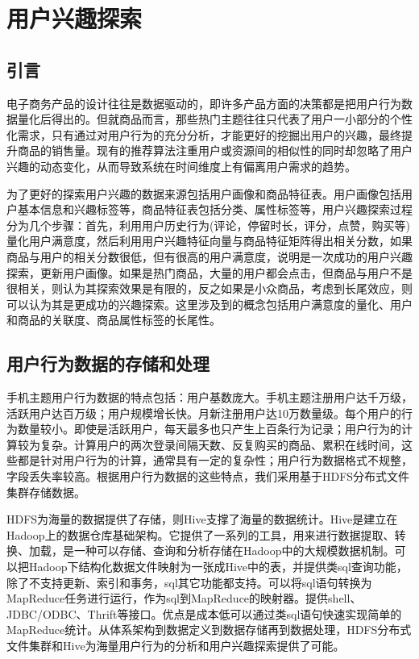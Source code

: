 
\chapter{用户兴趣探索}
\section{引言}
\label{chap:interestExplore}
电子商务产品的设计往往是数据驱动的，即许多产品方面的决策都是把用户行为数据量化后得出的。但就商品而言，那些热门主题往往只代表了用户一小部分的个性化需求，只有通过对用户行为的充分分析，才能更好的挖掘出用户的兴趣，最终提升商品的销售量。现有的推荐算法注重用户或资源间的相似性的同时却忽略了用户兴趣的动态变化，从而导致系统在时间维度上有偏离用户需求的趋势。

为了更好的探索用户兴趣的数据来源包括用户画像和商品特征表。用户画像包括用户基本信息和兴趣标签等，商品特征表包括分类、属性标签等，用户兴趣探索过程分为几个步骤：首先，利用用户历史行为(评论，停留时长，评分，点赞，购买等)量化用户满意度，然后利用用户兴趣特征向量与商品特征矩阵得出相关分数，如果商品与用户的相关分数很低，但有很高的用户满意度，说明是一次成功的用户兴趣探索，更新用户画像。如果是热门商品，大量的用户都会点击，但商品与用户不是很相关，则认为其探索效果是有限的，反之如果是小众商品，考虑到长尾效应，则可以认为其是更成功的兴趣探索。这里涉及到的概念包括用户满意度的量化、用户和商品的关联度、商品属性标签的长尾性。

\section{用户行为数据的存储和处理}
手机主题用户行为数据的特点包括：用户基数庞大。手机主题注册用户达千万级，活跃用户达百万级；用户规模增长快。月新注册用户达10万数量级。每个用户的行为数量较小。即使是活跃用户，每天最多也只产生上百条行为记录；用户行为的计算较为复杂。计算用户的两次登录间隔天数、反复购买的商品、累积在线时间，这些都是针对用户行为的计算，通常具有一定的复杂性；用户行为数据格式不规整，字段丢失率较高。根据用户行为数据的这些特点，我们采用基于HDFS分布式文件集群存储数据。

HDFS为海量的数据提供了存储，则Hive支撑了海量的数据统计。Hive是建立在Hadoop上的数据仓库基础架构。它提供了一系列的工具，用来进行数据提取、转换、加载，是一种可以存储、查询和分析存储在Hadoop中的大规模数据机制。可以把Hadoop下结构化数据文件映射为一张成Hive中的表，并提供类sql查询功能，除了不支持更新、索引和事务，sql其它功能都支持。可以将sql语句转换为MapReduce任务进行运行，作为sql到MapReduce的映射器。提供shell、JDBC/ODBC、Thrift等接口。优点是成本低可以通过类sql语句快速实现简单的MapReduce统计。从体系架构到数据定义到数据存储再到数据处理，HDFS分布式文件集群和Hive为海量用户行为的分析和用户兴趣探索提供了可能。
